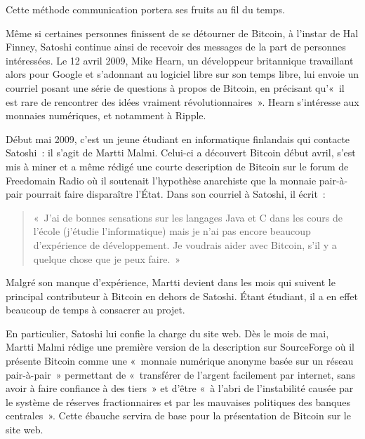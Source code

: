Cette méthode communication portera ses fruits au fil du temps.


Même si certaines personnes finissent de se détourner de Bitcoin, à l'instar de Hal Finney, Satoshi continue ainsi de recevoir des messages de la part de personnes intéressées. Le 12 avril 2009, Mike Hearn, un développeur britannique travaillant alors pour Google et s'adonnant au logiciel libre sur son temps libre, lui envoie un courriel posant une série de questions à propos de Bitcoin, en précisant qu'«~il est rare de rencontrer des idées vraiment révolutionnaires~». Hearn s'intéresse aux monnaies numériques, et notamment à Ripple.

Début mai 2009, c'est un jeune étudiant en informatique finlandais qui contacte Satoshi~: il s'agit de Martti Malmi. Celui-ci a découvert Bitcoin début avril, s'est mis à miner et a même rédigé une courte description de Bitcoin sur le forum de Freedomain Radio où il soutenait l'hypothèse anarchiste que la monnaie pair-à-pair pourrait faire disparaître l'État. Dans son courriel à Satoshi, il écrit~:

\begin{quote}
«~J'ai de bonnes sensations sur les langages Java et C dans les cours de l'école (j'étudie l'informatique) mais je n'ai pas encore beaucoup d'expérience de développement. Je voudrais aider avec Bitcoin, s'il y a quelque chose que je peux faire.~»
\end{quote}

Malgré son manque d'expérience, Martti devient dans les mois qui suivent le principal contributeur à Bitcoin en dehors de Satoshi. Étant étudiant, il a en effet beaucoup de temps à consacrer au projet.

En particulier, Satoshi lui confie la charge du site web. Dès le mois de mai, Martti Malmi rédige une première version de la description sur SourceForge où il présente Bitcoin comme une «~monnaie numérique anonyme basée sur un réseau pair-à-pair~» permettant de «~transférer de l'argent facilement par internet, sans avoir à faire confiance à des tiers~» et d'être «~à l'abri de l'instabilité causée par le système de réserves fractionnaires et par les mauvaises politiques des banques centrales~». Cette ébauche servira de base pour la présentation de Bitcoin sur le site web.

